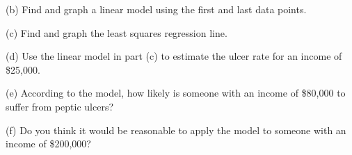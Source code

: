 \documentclass{sebase}
\begin{document}
\begin{multicols}{2}
\begin{ExerciseList}
\begin{ExerciseList}
\item[(b)] Find and graph a linear model using the first and last data
points.

%

\item[(c)] Find and graph the least squares regression line.

%

\item[(d)] Use the linear model in part (c) to estimate the ulcer rate for
an income of \$25,000.

%

\item[(e)] According to the model, how likely is someone with an income of
\$80,000 to suffer from peptic ulcers?

%

\item[(f)] Do you think it would be reasonable to apply the model to someone
with an income of \$200,000?

%
\end{ExerciseList}


\end{ExerciseList}
\end{multicols}
\end{document}
